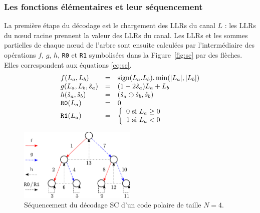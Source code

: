 \subsubsection{Les fonctions élémentaires et leur séquencement}
La première étape du décodage est le chargement des LLRs du canal $L$ : les LLRs du nœud racine prennent la valeur des LLRs du canal. Les LLRs et les sommes partielles de chaque nœud de l'arbre sont ensuite calculées par l'intermédiaire des opérations $f$, $g$, $h$, \texttt{R0} et \texttt{R1} symbolisées dans la Figure~\ref{fig:sc} par des flèches. Elles correspondent aux équations \ref{eq:sc}. 
\begin{eqnarray}
  \begin{array}{l c l}
    f(L_a,L_b) &=& \text{sign}(L_a.L_b).\min(|L_a|,|L_b|)\\
    g(L_a,L_b,\hat{s}_a)&=&(1-2\hat{s}_a)L_a+L_b\\
    h(\hat{s}_a,\hat{s}_b)&=& (\hat{s}_{a} \oplus \hat{s}_{b}, \hat{s}_{b})\\
    \texttt{R0}(L_a) &=& 0 \\
    \texttt{R1}(L_a) &=&  \left\{\begin{array}{l c l} 0 \text{ si } L_a \geq 0 \\ 1 \text{ si } L_a < 0 \end{array}\right.
  \end{array}
  \label{eq:sc}
\end{eqnarray}
\begin{figure}[b]
\centering
\includegraphics[width=0.5\textwidth]{main/ch1_fig/seq_sc}
\caption{Séquencement du décodage SC d'un code polaire de taille $N=4$.}
\label{fig:seq_sc}
\end{figure}
